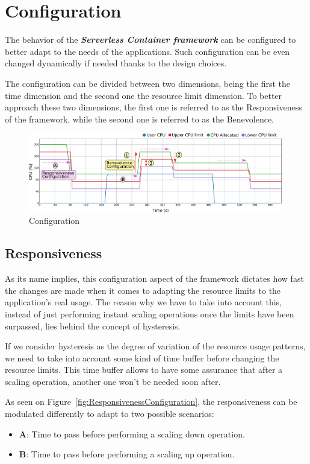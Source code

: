 \documentclass[12pt]{article}
\begin{document}
\section{Configuration}
\label{sec:Configuration}
The behavior of the \textit{\textbf{Serverless Container framework}} can be configured to better adapt to the needs of the applications. Such configuration can be even changed dynamically if needed thanks to the design choices.

The configuration can be divided between two dimensions, being the first the time dimension and the second one the resource limit dimension. To better approach these two dimensions, the first one is referred to as the Responsiveness of the framework, while the second one is referred to as the Benevolence.

\begin{figure}[!tb]
	\centering
	\includegraphics[width=0.99\textwidth]{../img/configuration/configuration.png}
	\caption{Configuration}
	\label{fig:Configuration}
\end{figure}

\subsection{Responsiveness}
As its name implies, this configuration aspect of the framework dictates how fast the changes are made when it comes to adapting the resource limits to the application's real usage. The reason why we have to take into account this, instead of just performing instant scaling operations once the limits have been surpassed, lies behind the concept of hysteresis.

If we consider hysteresis as the degree of variation of the resource usage patterns, we need to take into account some kind of time buffer before changing the resource limits. This time buffer allows to have some assurance that after a scaling operation, another one won't be needed soon after.

As seen on Figure~\ref{fig:ResponsivenessConfiguration}, the responsiveness can be modulated differently to adapt to two possible scenarios:
\begin{itemize}
	\item \textbf{A}: Time to pass before performing a scaling down operation.
	\item \textbf{B}: Time to pass before performing a scaling up operation.
\end{itemize}
\end{document}
